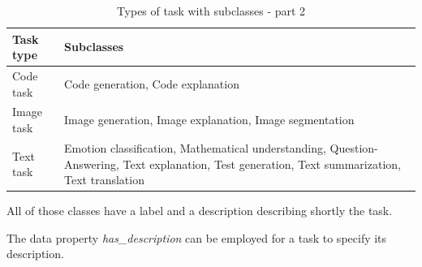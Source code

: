 \begin{table}[H]
    \centering
    \begin{tabular}{|>{\raggedright\arraybackslash}p{6cm}|>{\raggedright\arraybackslash}p{6cm}|}
        \hline
        \textbf{Task type} & \textbf{Subclasses} \\ \hline
        Code task & Code generation, Code explanation \\ \hline

        Image task & Image generation, Image explanation, Image segmentation \\ \hline

        Text task & Emotion classification, Mathematical understanding, Question-Answering, Text explanation, Test generation, Text summarization, Text translation \\ \hline
    \end{tabular}
    \caption{Types of task with subclasses - part 2}
\end{table}
All of those classes have a label and a description describing shortly the task. %

The data property \textit{has\_description} can be employed for a task to specify its description.

